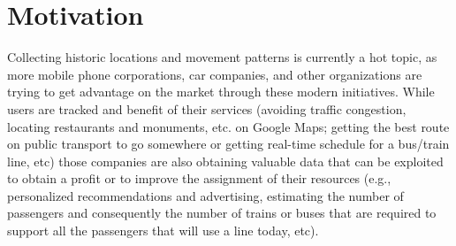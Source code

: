 	\section{Motivation}
	\label{sec:gis:intro}
    Collecting historic locations and movement patterns is currently a hot topic, as more mobile phone corporations, car companies, and other organizations are trying to get advantage on the market through these modern initiatives. While users are tracked and benefit of their services (avoiding traffic congestion, locating restaurants and monuments, etc. on Google Maps; getting the best route on public transport to go somewhere or getting real-time schedule for a bus/train line, etc) those companies are also obtaining valuable data that can be exploited to obtain a profit or to improve the assignment of their resources (e.g., personalized recommendations and advertising, estimating the number of passengers and consequently the number of trains or buses that are required to support all the passengers that will use a line today, etc).
    

